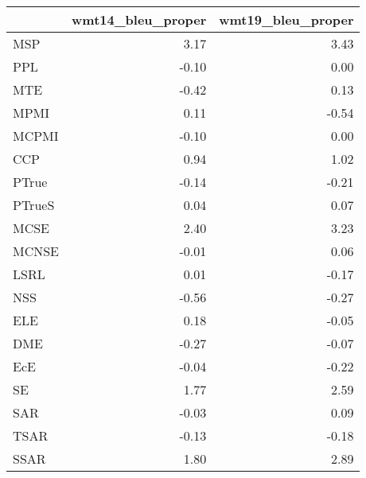 \begin{tabular}{lrr}
\toprule
 & wmt14\_bleu\_proper & wmt19\_bleu\_proper \\
\midrule
MSP & 3.17 & 3.43 \\
PPL & -0.10 & 0.00 \\
MTE & -0.42 & 0.13 \\
MPMI & 0.11 & -0.54 \\
MCPMI & -0.10 & 0.00 \\
CCP & 0.94 & 1.02 \\
PTrue & -0.14 & -0.21 \\
PTrueS & 0.04 & 0.07 \\
MCSE & 2.40 & 3.23 \\
MCNSE & -0.01 & 0.06 \\
LSRL & 0.01 & -0.17 \\
NSS & -0.56 & -0.27 \\
ELE & 0.18 & -0.05 \\
DME & -0.27 & -0.07 \\
EcE & -0.04 & -0.22 \\
SE & 1.77 & 2.59 \\
SAR & -0.03 & 0.09 \\
TSAR & -0.13 & -0.18 \\
SSAR & 1.80 & 2.89 \\
\bottomrule
\end{tabular}
